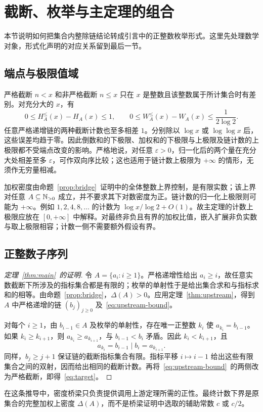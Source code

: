 \section{截断、枚举与主定理的组合}\label{sec:conversion}
本节说明如何把集合内整除链结论转成引言中的正整数枚举形式。这里先处理数学对象，形式化声明的对应关系留到最后一节。

\subsection{端点与极限值域}
严格截断 $n<x$ 和非严格截断 $n\le x$ 只在 $x$ 是整数且该整数属于所计集合时有差别。对充分大的 $x$，有
\[
 0\le H_A^{\le}(x)-H_A(x)\le1,\qquad
 0\le W_A^{\le}(x)-W_A(x)\le\frac1{2\log2}.
\]
任意严格递增链的两种截断计数也至多相差 $1$。分别除以 $\log x$ 或 $\log\log x$ 后，这些误差均趋于零。因此倒数和的下极限、加权和的下极限与上极限及链计数的上极限都不受端点改变的影响。严格地说，对任意 $\varepsilon>0$，归一化后的两个量在充分大处相差至多 $\varepsilon$，可作双向序比较；这也适用于链计数上极限为 $+\infty$ 的情形，无须作无穷量相减。

加权密度由命题~\ref{prop:bridge}~证明中的全体整数上界控制，是有限实数；该上界对任意 $A\subseteq\mathbb N_{>0}$ 成立，并不要求其下对数密度为正。链计数的归一化上极限则可能为 $+\infty$。例如 $1,2,4,8,\ldots$ 的计数为 $\log x/\log2+O(1)$。故主定理的计数上极限应放在 $[0,+\infty]$ 中解释。对最终非负且有界的加权比值，嵌入扩展非负实数与取上极限相容；计数一侧不需要额外假设有界。

\subsection{正整数子序列}
\begin{proof}[定理~\ref{thm:main}~的证明]
令 $A=\{a_i:i\ge1\}$。严格递增性给出 $a_i\ge i$，故任意实数截断下所涉及的指标集合都是有限的；枚举的单射性于是给出集合求和与指标求和的相等。由命题~\ref{prop:bridge}，$\Delta(A)>0$。应用定理~\ref{thm:upstream}，得到 $A$ 中严格递增的链 $(b_j)_{j\ge0}$ 及~\eqref{eq:upstream-bound}。

对每个 $i\ge1$，由 $b_{i-1}\in A$ 及枚举的单射性，存在唯一正整数 $k_i$ 使 $a_{k_i}=b_{i-1}$。如果 $k_i\ge k_{i+1}$，则 $a_{k_i}\ge a_{k_{i+1}}$，与 $b_{i-1}<b_i$ 矛盾。因此 $k_i<k_{i+1}$，且
\[
 a_{k_i}=b_{i-1}\mid b_i=a_{k_{i+1}}.
\]
同样，$b_j\ge j+1$ 保证链的截断指标集合有限。指标平移 $i\mapsto i-1$ 给出这些有限集合之间的双射，因而给出相同的截断计数。再将~\eqref{eq:upstream-bound}~的两侧改为严格截断，即得~\eqref{eq:target}。
\end{proof}

在这条推导中，密度桥梁只负责提供调用上游定理所需的正性。最终计数下界是原集合的完整加权上密度 $\Delta(A)$，而不是桥梁证明中选取的辅助常数 $c$ 或 $c/2$。
